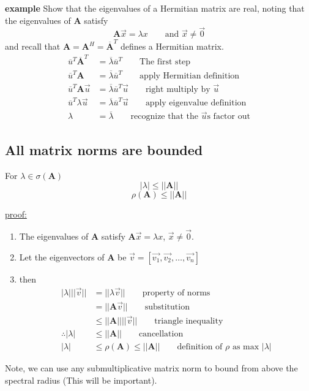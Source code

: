 \documentclass[12pt]{article}
\newcommand{\ve}[1]{\ensuremath{\mathbf{#1}}}
\newcommand{\cc}[1]{\ensuremath{\overline{#1}}}
\newcommand{\ccm}[1]{\ensuremath{\overline{\mathbf{#1}}}}
\begin{document}
\textbf{example}
Show that the eigenvalues of a Hermitian matrix are real, noting that the eigenvalues of $\ve{A}$ satisfy
\[\ve{A}\vec{x} = \lambda x \qquad \text{and } \vec{x} \neq \vec{0}\]
and recall that $\ve{A} = \ve{A}^H = \ccm{A}^T$ defines a Hermitian matrix.
%
\begin{align}
\cc{u}^T \ccm{A}^T &= \cc{\lambda} \cc{u}^T
\qquad \text{The first step} \nonumber \\
%
\cc{u}^T \ve{A} &= \cc{\lambda} \cc{u}^T 
\qquad \text{apply Hermitian definition}\nonumber \\
%
\cc{u}^T \ve{A} \vec{u} &= \cc{\lambda} \cc{u}^T \vec{u}
\qquad \text{right multiply by }\vec{u}\nonumber \\
%
\cc{u}^T \lambda \vec{u} &= \cc{\lambda} \cc{u}^T \vec{u}
\qquad \text{apply eigenvalue definition }\nonumber \\
%
\lambda &= \cc{\lambda} 
\qquad \text{recognize that the }\vec{u}\text{s factor out}\nonumber
\end{align}
 
\subsection{All matrix norms are bounded}

For $\lambda \in \sigma(\ve{A})$ 
\[|\lambda | \leq ||\ve{A}||\]
\[\rho(\ve{A}) \leq ||\ve{A}||\]

\underline{proof:} 
\begin{enumerate}
\item The eigenvalues of $\ve{A}$ satisfy $\ve{A}\vec{x} = \lambda x$, $\vec{x} \neq \vec{0}$. 

\item Let the eigenvectors of $\ve{A}$ be $\vec{v} = [\vec{v_1}, \vec{v_2}, \dots, \vec{v_n}]$

\item then 
\begin{align}
|\lambda | ||\vec{v}|| &= ||\lambda \vec{v}|| 
\qquad \text{property of norms} \nonumber \\
%
                     &= ||\ve{A}\vec{v}|| 
                     \qquad \text{substitution} \nonumber \\
%
                     &\leq ||\ve{A}|| ||\vec{v}||
                     \qquad \text{triangle inequality} \nonumber \\
%
\therefore |\lambda | &\leq ||\ve{A}|| 
\qquad \text{cancellation}\nonumber \\
%
|\lambda| &\leq \rho(\ve{A}) \leq ||\ve{A}|| 
\qquad \text{definition of }\rho\text{ as max }|\lambda | \nonumber
\end{align}
\end{enumerate}

Note, we can use any submultiplicative matrix norm to bound from above the spectral radius (This will be important).
\end{document}
